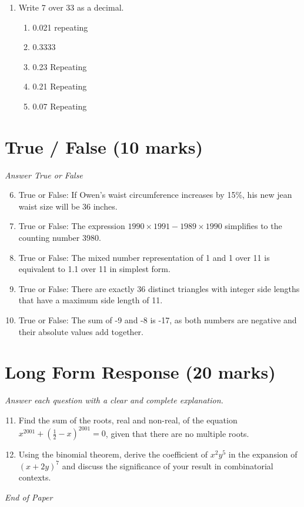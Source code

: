 \documentclass[12pt]{article}
\begin{document}
\begin{enumerate}[label=\arabic*.]
\begin{enumerate}[label=(\alph*)]
    \item 47,924
    \item 47,999
    \item 47,520
\end{enumerate}
\item Write 7 over 33 as a decimal.
\begin{enumerate}[label=(\alph*)]
    \item 0.021 repeating
    \item 0.3333
    \item 0.23 Repeating
    \item 0.21 Repeating
    \item 0.07 Repeating
\end{enumerate}
\end{enumerate}

\section*{True / False (10 marks)}
\textit{Answer True or False}
\begin{enumerate}[label=\arabic*.]
\setcounter{enumi}{5}
\item True or False: If Owen's waist circumference increases by 15\%, his new jean waist size will be 36 inches.
\item True or False: The expression $1990 \times 1991 - 1989 \times 1990$ simplifies to the counting number 3980.
\item True or False: The mixed number representation of 1 and 1 over 11 is equivalent to 1.1 over 11 in simplest form.
\item True or False: There are exactly 36 distinct triangles with integer side lengths that have a maximum side length of 11.
\item True or False: The sum of -9 and -8 is -17, as both numbers are negative and their absolute values add together.
\end{enumerate}

\section*{Long Form Response (20 marks)}
\textit{Answer each question with a clear and complete explanation.}
\begin{enumerate}[label=\arabic*.]
\setcounter{enumi}{10}
\item Find the sum of the roots, real and non-real, of the equation $x^{2001}+\left(\frac
12-x\right)^{2001}=0$, given that there are no multiple roots.
\item Using the binomial theorem, derive the coefficient of \( x^2y^5 \) in the expansion of \(
(x + 2y)^7 \) and discuss the significance of your result in combinatorial contexts.
\end{enumerate}

\vfill
\noindent\textit{End of Paper}
\end{document}
